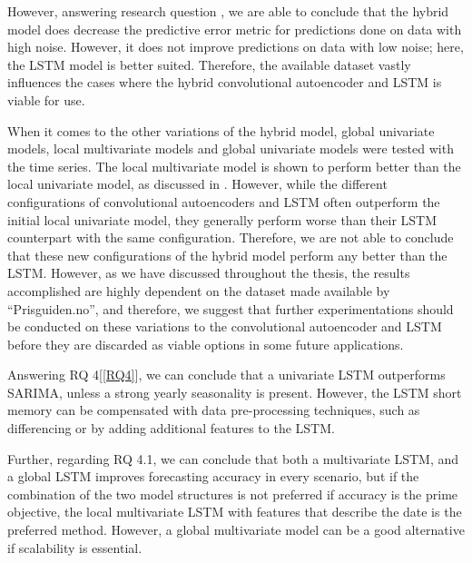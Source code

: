 However, answering research question , we are able to conclude that the hybrid model does
decrease the predictive error metric for predictions done on data with high noise.
However, it does not improve predictions on data with low noise; here, the LSTM model is better suited.
Therefore, the available dataset vastly influences the cases where the hybrid convolutional autoencoder and LSTM is viable for use.

When it comes to the other variations of the hybrid model, global univariate models,
local multivariate models and global univariate models were tested with the time series.
The local multivariate model is shown to perform better than the local univariate model, as discussed in .
However, while the different configurations of convolutional autoencoders and LSTM often outperform the initial local univariate model,
they generally perform worse than their LSTM counterpart with the same configuration.
Therefore, we are not able to conclude that these new configurations of the hybrid model perform any better than the LSTM.
However, as we have discussed throughout the thesis, the results accomplished are highly dependent on the dataset made available by ``Prisguiden.no'',
and therefore, we suggest that further experimentations should be conducted on these variations to the convolutional autoencoder and LSTM
before they are discarded as viable options in some future applications.



Answering RQ 4[\ref{RQ4}], we can conclude that a univariate LSTM outperforms SARIMA,
unless a strong yearly seasonality is present. However, the LSTM short memory can be
compensated with data pre-processing techniques, such as differencing or by adding
additional features to the LSTM.

Further, regarding RQ 4.1, we can conclude that both a multivariate LSTM,
and a global LSTM improves forecasting accuracy in every scenario, but if the combination
of the two model structures is not preferred if accuracy is the prime objective,
the local multivariate LSTM with features that describe the date is the preferred method.
However, a global multivariate model can be a good alternative if scalability is essential.

